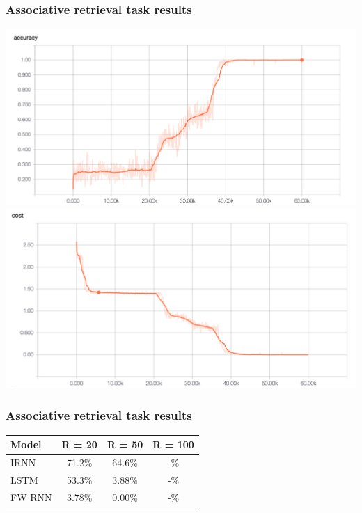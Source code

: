 \documentclass{beamer}
\begin{document}
\begin{frame}
  \frametitle{Associative retrieval task results}
  \begin{center}
  \includegraphics[scale=0.20]{../final/images/fast_weight_r_50_accuracy.png}
  \includegraphics[scale=0.20]{../final/images/fast_weight_r_50_cost.png}
  \end{center}
\end{frame}

\begin{frame}
  \frametitle{Associative retrieval task results}
  \begin{center}
    \begin{tabular}{lccc}
      Model & R = 20 & R = 50 & R = 100 \\
      \hline
      IRNN & 71.2\% & 64.6\% & -\% \\
      LSTM & 53.3\% & 3.88\% & -\% \\
      FW RNN & 3.78\% & 0.00\% & -\%
    \end{tabular}
  \end{center}
\end{frame}

\end{document}
